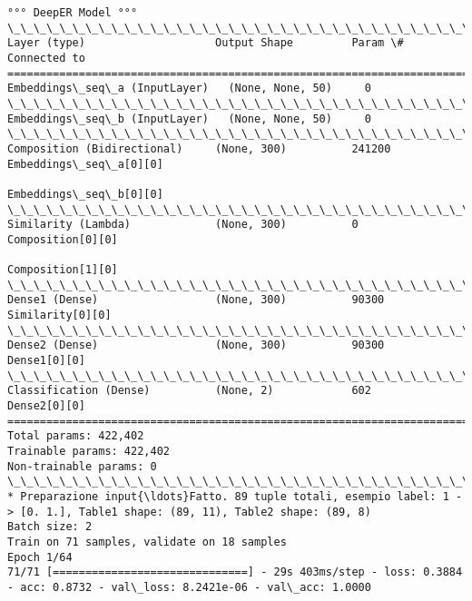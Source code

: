 \documentclass[11pt]{article}
\begin{document}
\begin{Verbatim}[commandchars=\\\{\}]
°°° DeepER Model °°°
\_\_\_\_\_\_\_\_\_\_\_\_\_\_\_\_\_\_\_\_\_\_\_\_\_\_\_\_\_\_\_\_\_\_\_\_\_\_\_\_\_\_\_\_\_\_\_\_\_\_\_\_\_\_\_\_\_\_\_\_\_\_\_\_\_\_\_\_\_\_\_\_\_\_\_\_\_\_\_\_\_\_\_\_\_\_\_\_\_\_\_\_\_\_\_\_\_\_
Layer (type)                    Output Shape         Param \#     Connected to                     
==================================================================================================
Embeddings\_seq\_a (InputLayer)   (None, None, 50)     0                                            
\_\_\_\_\_\_\_\_\_\_\_\_\_\_\_\_\_\_\_\_\_\_\_\_\_\_\_\_\_\_\_\_\_\_\_\_\_\_\_\_\_\_\_\_\_\_\_\_\_\_\_\_\_\_\_\_\_\_\_\_\_\_\_\_\_\_\_\_\_\_\_\_\_\_\_\_\_\_\_\_\_\_\_\_\_\_\_\_\_\_\_\_\_\_\_\_\_\_
Embeddings\_seq\_b (InputLayer)   (None, None, 50)     0                                            
\_\_\_\_\_\_\_\_\_\_\_\_\_\_\_\_\_\_\_\_\_\_\_\_\_\_\_\_\_\_\_\_\_\_\_\_\_\_\_\_\_\_\_\_\_\_\_\_\_\_\_\_\_\_\_\_\_\_\_\_\_\_\_\_\_\_\_\_\_\_\_\_\_\_\_\_\_\_\_\_\_\_\_\_\_\_\_\_\_\_\_\_\_\_\_\_\_\_
Composition (Bidirectional)     (None, 300)          241200      Embeddings\_seq\_a[0][0]           
                                                                 Embeddings\_seq\_b[0][0]           
\_\_\_\_\_\_\_\_\_\_\_\_\_\_\_\_\_\_\_\_\_\_\_\_\_\_\_\_\_\_\_\_\_\_\_\_\_\_\_\_\_\_\_\_\_\_\_\_\_\_\_\_\_\_\_\_\_\_\_\_\_\_\_\_\_\_\_\_\_\_\_\_\_\_\_\_\_\_\_\_\_\_\_\_\_\_\_\_\_\_\_\_\_\_\_\_\_\_
Similarity (Lambda)             (None, 300)          0           Composition[0][0]                
                                                                 Composition[1][0]                
\_\_\_\_\_\_\_\_\_\_\_\_\_\_\_\_\_\_\_\_\_\_\_\_\_\_\_\_\_\_\_\_\_\_\_\_\_\_\_\_\_\_\_\_\_\_\_\_\_\_\_\_\_\_\_\_\_\_\_\_\_\_\_\_\_\_\_\_\_\_\_\_\_\_\_\_\_\_\_\_\_\_\_\_\_\_\_\_\_\_\_\_\_\_\_\_\_\_
Dense1 (Dense)                  (None, 300)          90300       Similarity[0][0]                 
\_\_\_\_\_\_\_\_\_\_\_\_\_\_\_\_\_\_\_\_\_\_\_\_\_\_\_\_\_\_\_\_\_\_\_\_\_\_\_\_\_\_\_\_\_\_\_\_\_\_\_\_\_\_\_\_\_\_\_\_\_\_\_\_\_\_\_\_\_\_\_\_\_\_\_\_\_\_\_\_\_\_\_\_\_\_\_\_\_\_\_\_\_\_\_\_\_\_
Dense2 (Dense)                  (None, 300)          90300       Dense1[0][0]                     
\_\_\_\_\_\_\_\_\_\_\_\_\_\_\_\_\_\_\_\_\_\_\_\_\_\_\_\_\_\_\_\_\_\_\_\_\_\_\_\_\_\_\_\_\_\_\_\_\_\_\_\_\_\_\_\_\_\_\_\_\_\_\_\_\_\_\_\_\_\_\_\_\_\_\_\_\_\_\_\_\_\_\_\_\_\_\_\_\_\_\_\_\_\_\_\_\_\_
Classification (Dense)          (None, 2)            602         Dense2[0][0]                     
==================================================================================================
Total params: 422,402
Trainable params: 422,402
Non-trainable params: 0
\_\_\_\_\_\_\_\_\_\_\_\_\_\_\_\_\_\_\_\_\_\_\_\_\_\_\_\_\_\_\_\_\_\_\_\_\_\_\_\_\_\_\_\_\_\_\_\_\_\_\_\_\_\_\_\_\_\_\_\_\_\_\_\_\_\_\_\_\_\_\_\_\_\_\_\_\_\_\_\_\_\_\_\_\_\_\_\_\_\_\_\_\_\_\_\_\_\_
* Preparazione input{\ldots}Fatto. 89 tuple totali, esempio label: 1 -> [0. 1.], Table1 shape: (89, 11), Table2 shape: (89, 8)
Batch size: 2
Train on 71 samples, validate on 18 samples
Epoch 1/64
71/71 [==============================] - 29s 403ms/step - loss: 0.3884 - acc: 0.8732 - val\_loss: 8.2421e-06 - val\_acc: 1.0000


\end{Verbatim}
\end{document}
